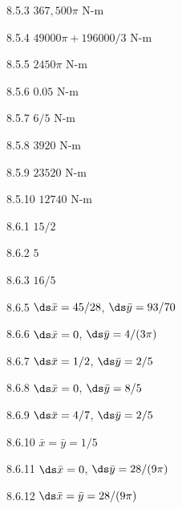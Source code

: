 \begin{Answer}{8.5.3}
 $367,500 \pi$ N-m
\end{Answer}
\begin{Answer}{8.5.4}
 $49000\pi + 196000/3$ N-m
\end{Answer}
\begin{Answer}{8.5.5}
 $2450\pi$ N-m
\end{Answer}
\begin{Answer}{8.5.6}
 $0.05$ N-m
\end{Answer}
\begin{Answer}{8.5.7}
 $6/5$ N-m
\end{Answer}
\begin{Answer}{8.5.8}
 $3920$ N-m
\end{Answer}
\begin{Answer}{8.5.9}
 $23520$ N-m
\end{Answer}
\begin{Answer}{8.5.10}
 $12740$ N-m
\end{Answer}
\begin{Answer}{8.6.1}
$15/2$
\end{Answer}
\begin{Answer}{8.6.2}
$5$
\end{Answer}
\begin{Answer}{8.6.3}
$16/5$
\end{Answer}
\begin{Answer}{8.6.5}
$\ds \bar x=45/28$, $\ds \bar y = 93/70$
\end{Answer}
\begin{Answer}{8.6.6}
$\ds \bar x=0$, $\ds \bar y=4/(3\pi)$
\end{Answer}
\begin{Answer}{8.6.7}
$\ds \bar x=1/2$, $\ds \bar y=2/5$
\end{Answer}
\begin{Answer}{8.6.8}
$\ds \bar x=0$, $\ds \bar y=8/5$
\end{Answer}
\begin{Answer}{8.6.9}
$\ds \bar x=4/7$, $\ds \bar y=2/5$
\end{Answer}
\begin{Answer}{8.6.10}
$\bar x=\bar y=1/5$
\end{Answer}
\begin{Answer}{8.6.11}
$\ds \bar x=0$, $\ds \bar y=28/(9\pi)$
\end{Answer}
\begin{Answer}{8.6.12}
$\ds \bar x=\bar y=28/(9\pi)$
\end{Answer}
